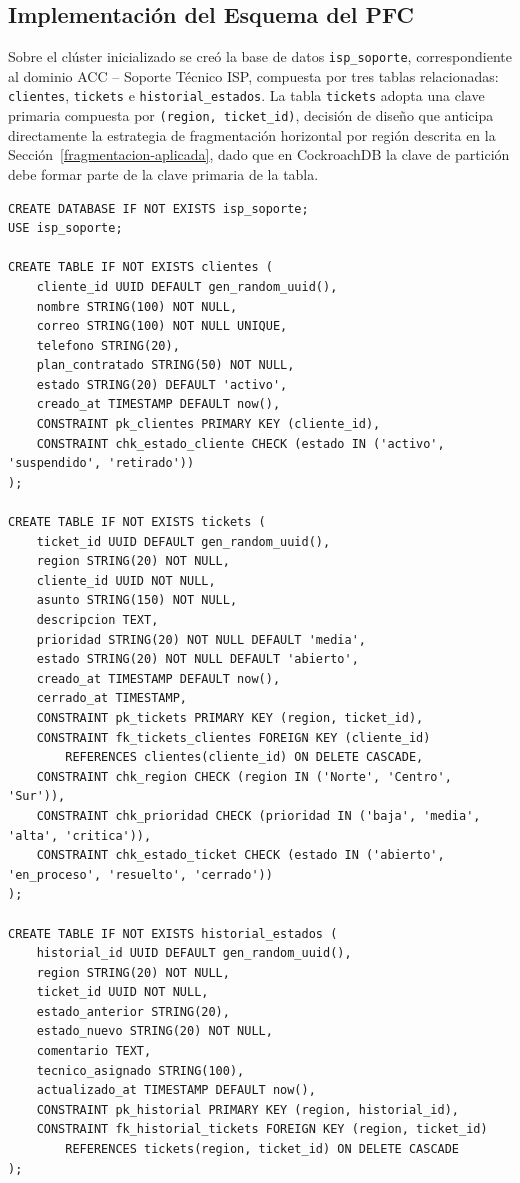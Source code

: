 \documentclass[12pt, a4paper]{article}
\begin{document}
\subsection{Implementación del Esquema del PFC}

Sobre el clúster inicializado se creó la base de datos \texttt{isp\_soporte}, correspondiente al dominio ACC -- Soporte Técnico ISP, compuesta por tres tablas relacionadas: \texttt{clientes}, \texttt{tickets} e \texttt{historial\_estados}. La tabla \texttt{tickets} adopta una clave primaria compuesta por \texttt{(region, ticket\_id)}, decisión de diseño que anticipa directamente la estrategia de fragmentación horizontal por región descrita en la Sección~\ref{fragmentacion-aplicada}, dado que en CockroachDB la clave de partición debe formar parte de la clave primaria de la tabla.

\begin{lstlisting}[style=sqlstyle, caption={Esquema de base de datos del dominio ACC -- Soporte Técnico ISP}, label={lst:schema}]
CREATE DATABASE IF NOT EXISTS isp_soporte;
USE isp_soporte;

CREATE TABLE IF NOT EXISTS clientes (
    cliente_id UUID DEFAULT gen_random_uuid(),
    nombre STRING(100) NOT NULL,
    correo STRING(100) NOT NULL UNIQUE,
    telefono STRING(20),
    plan_contratado STRING(50) NOT NULL,
    estado STRING(20) DEFAULT 'activo',
    creado_at TIMESTAMP DEFAULT now(),
    CONSTRAINT pk_clientes PRIMARY KEY (cliente_id),
    CONSTRAINT chk_estado_cliente CHECK (estado IN ('activo', 'suspendido', 'retirado'))
);

CREATE TABLE IF NOT EXISTS tickets (
    ticket_id UUID DEFAULT gen_random_uuid(),
    region STRING(20) NOT NULL,
    cliente_id UUID NOT NULL,
    asunto STRING(150) NOT NULL,
    descripcion TEXT,
    prioridad STRING(20) NOT NULL DEFAULT 'media',
    estado STRING(20) NOT NULL DEFAULT 'abierto',
    creado_at TIMESTAMP DEFAULT now(),
    cerrado_at TIMESTAMP,
    CONSTRAINT pk_tickets PRIMARY KEY (region, ticket_id),
    CONSTRAINT fk_tickets_clientes FOREIGN KEY (cliente_id)
        REFERENCES clientes(cliente_id) ON DELETE CASCADE,
    CONSTRAINT chk_region CHECK (region IN ('Norte', 'Centro', 'Sur')),
    CONSTRAINT chk_prioridad CHECK (prioridad IN ('baja', 'media', 'alta', 'critica')),
    CONSTRAINT chk_estado_ticket CHECK (estado IN ('abierto', 'en_proceso', 'resuelto', 'cerrado'))
);

CREATE TABLE IF NOT EXISTS historial_estados (
    historial_id UUID DEFAULT gen_random_uuid(),
    region STRING(20) NOT NULL,
    ticket_id UUID NOT NULL,
    estado_anterior STRING(20),
    estado_nuevo STRING(20) NOT NULL,
    comentario TEXT,
    tecnico_asignado STRING(100),
    actualizado_at TIMESTAMP DEFAULT now(),
    CONSTRAINT pk_historial PRIMARY KEY (region, historial_id),
    CONSTRAINT fk_historial_tickets FOREIGN KEY (region, ticket_id)
        REFERENCES tickets(region, ticket_id) ON DELETE CASCADE
);
\end{lstlisting}
\end{document}
